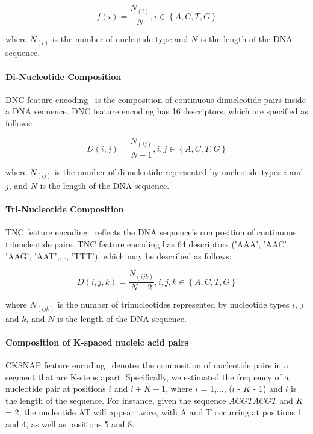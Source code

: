 \begin{equation}\label{eq:NAC}
    f(i) = \frac{N_{(i)}}{N}, i \in \left\{A,C,T,G\right\}
\end{equation}

where $N_{(i)}$ is the number of nucleotide type and $N$ is the length of the \gls{DNA} sequence.

\paragraph{Di-Nucleotide Composition}

\gls{DNC} feature encoding~\cite{Grabherr2011ExploitingPromoters, Panwar2015IdentificationTri-nucleotides} is the composition of continuous dinucleotide pairs inside a \gls{DNA} sequence. \gls{DNC} feature encoding has 16 descriptors, which are specified as follows:

\begin{equation}\label{eq:DNC}
    D(i,j) = \frac{N_{(ij)}}{N-1}, i,j \in \left\{A,C,T,G\right\}
\end{equation}

where $N_{(ij)}$ is the number of dinucleotide represented by nucleotide types $i$ and $j$, and $N$ is the length of the \gls{DNA} sequence.

\paragraph{Tri-Nucleotide Composition}

\gls{TNC} feature encoding~\cite{Qiu2014IRSpot-TNCPseAAC:Components,Panwar2014PredictionInformation} reflects the \gls{DNA} sequence's composition of continuous trinucleotide pairs. \gls{TNC} feature encoding has 64 descriptors ('AAA', 'AAC', 'AAG', 'AAT',..., 'TTT'), which may be described as follows:

\begin{equation}\label{eq:TNC}
    D(i,j,k) = \frac{N_{(ijk)}}{N-2}, i,j,k \in \left\{A,C,T,G\right\}
\end{equation}

where $N_{(ijk)}$ is the number of trinucleotides represented by nucleotide types $i$, $j$ and $k$, and $N$ is the length of the \gls{DNA} sequence.


\paragraph{Composition of K-spaced nucleic acid pairs}

\gls{CKSNAP} feature encoding~\cite{Zhang2013PredictionPairs,Liu2017BioSeq-Analysis:Approaches} denotes the composition of nucleotide pairs in a segment that are K-steps apart. Specifically, we estimated the frequency of a nucleotide pair at positions $i$ and $i + K + 1$, where $i$ = 1,..., ($l$ - $K$ - 1) and $l$ is the length of the sequence. For instance, given the sequence $ACGTACGT$ and $K$ = 2, the nucleotide AT will appear twice, with A and T occurring at positions 1 and 4, as well as positions 5 and 8.

